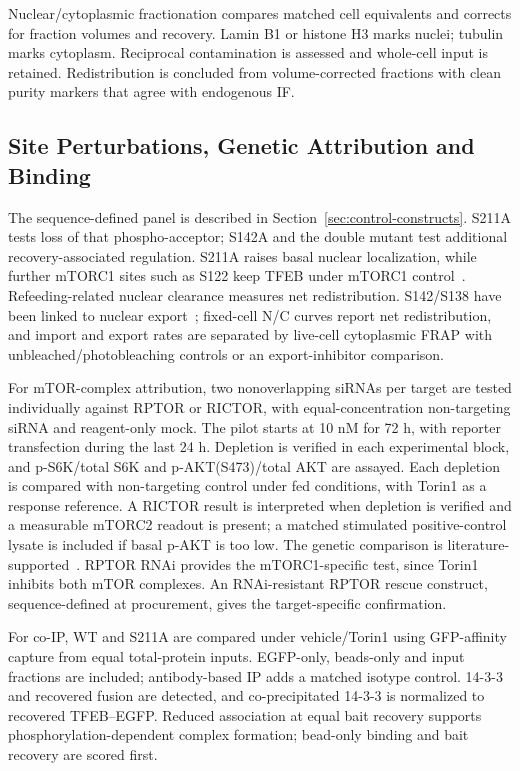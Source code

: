Nuclear/cytoplasmic fractionation compares matched cell equivalents and corrects for fraction volumes and recovery. Lamin B1 or histone H3 marks nuclei; tubulin marks cytoplasm. Reciprocal contamination is assessed and whole-cell input is retained. Redistribution is concluded from volume-corrected fractions with clean purity markers that agree with endogenous IF.

\subsection{Site Perturbations, Genetic Attribution and Binding}
The sequence-defined panel is described in Section~\ref{sec:control-constructs}. S211A tests loss of that phospho-acceptor; S142A and the double mutant test additional recovery-associated regulation. S211A raises basal nuclear localization, while further mTORC1 sites such as S122 keep TFEB under mTORC1 control~\cite{Vega2017}. Refeeding-related nuclear clearance measures net redistribution. S142/S138 have been linked to nuclear export~\cite{Napolitano2018}; fixed-cell N/C curves report net redistribution, and import and export rates are separated by live-cell cytoplasmic FRAP with unbleached/photobleaching controls or an export-inhibitor comparison.

For mTOR-complex attribution, two nonoverlapping siRNAs per target are tested individually against RPTOR or RICTOR, with equal-concentration non-targeting siRNA and reagent-only mock. The pilot starts at 10 nM for 72 h, with reporter transfection during the last 24 h. Depletion is verified in each experimental block, and p-S6K/total S6K and p-AKT(S473)/total AKT are assayed. Each depletion is compared with non-targeting control under fed conditions, with Torin1 as a response reference. A RICTOR result is interpreted when depletion is verified and a measurable mTORC2 readout is present; a matched stimulated positive-control lysate is included if basal p-AKT is too low. The genetic comparison is literature-supported~\cite{Martina2012}. RPTOR RNAi provides the mTORC1-specific test, since Torin1 inhibits both mTOR complexes. An RNAi-resistant RPTOR rescue construct, sequence-defined at procurement, gives the target-specific confirmation.

For co-IP, WT and S211A are compared under vehicle/Torin1 using GFP-affinity capture from equal total-protein inputs. EGFP-only, beads-only and input fractions are included; antibody-based IP adds a matched isotype control. 14-3-3 and recovered fusion are detected, and co-precipitated 14-3-3 is normalized to recovered TFEB--EGFP. Reduced association at equal bait recovery supports phosphorylation-dependent complex formation; bead-only binding and bait recovery are scored first.

